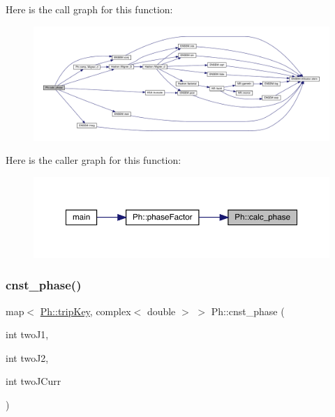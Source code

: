Here is the call graph for this function\+:
\nopagebreak
\begin{figure}[H]
\begin{center}
\leavevmode
\includegraphics[width=350pt]{d6/d3c/namespacePh_a8662b8eefea46c114386b136878a461c_cgraph}
\end{center}
\end{figure}
Here is the caller graph for this function\+:
\nopagebreak
\begin{figure}[H]
\begin{center}
\leavevmode
\includegraphics[width=350pt]{d6/d3c/namespacePh_a8662b8eefea46c114386b136878a461c_icgraph}
\end{center}
\end{figure}
\mbox{\label{namespacePh_ac0bb2f4b2888c7c304cb6fcb1b5a7ce2}} 
\subsubsection{\texorpdfstring{cnst\_phase()}{cnst\_phase()}}
{\footnotesize\ttfamily map$<$ \mbox{\hyperlink{namespacePh_afdd5bf3d7b37625115089ea3048e0cbb}{Ph\+::trip\+Key}}, complex$<$ double $>$ $>$ Ph\+::cnst\+\_\+phase (\begin{DoxyParamCaption}\item[{int}]{two\+J1,  }\item[{int}]{two\+J2,  }\item[{int}]{two\+J\+Curr }\end{DoxyParamCaption})}


